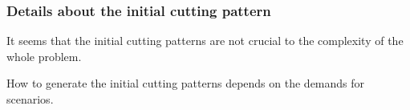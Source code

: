 









\subsubsection{Details about the initial cutting pattern}
It seems that the initial cutting patterns are not crucial to the complexity of the whole problem.

How to generate the initial cutting patterns depends on the demands for scenarios.

